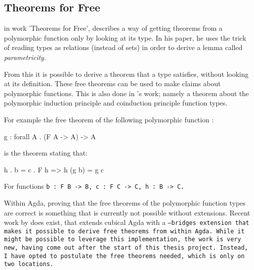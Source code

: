 
\subsection{Theorems for Free}\label{sec:free}
\cite{Wadler1989} in work 'Theorems for Free', describes a way of getting theorems from a polymorphic function only by looking at its type.
In his paper, he uses the trick of reading types as relations (instead of sets) in order to derive a lemma called \textit{parametricity}.

From this it is possible to derive a theorem that a type satisfies, without looking at its definition.
These free theorems can be used to make claims about polymorphic functions.
This is also done in \cite{Harper2011}'s work; namely a theorem about the polymorphic induction principle and coinduction principle function types.

For example the free theorem of the following polymorphic function \citep{Harper2011}:
\begin{code}
g : forall A . (F A -> A) -> A
\end{code}
is the theorem stating that:
\begin{code}
h . b = c . F h => h (g b) = g c
\end{code}
For functions \tt{b : F B -> B}, \tt{c : F C -> C}, \tt{h : B -> C}.


Within Agda, proving that the free theorems of the polymorphic function types are correct is something that is currently not possible without extensions.
Recent work by \cite{Muylder2023} does exist, that extends cubical Agda with a \tt{--bridges} extension that makes it possible to derive free theorems from within Agda.
While it might be possible to leverage this implementation, the work is very new, having come out after the start of this thesis project.
Instead, I have opted to postulate the free theorems needed, which is only on two locations.